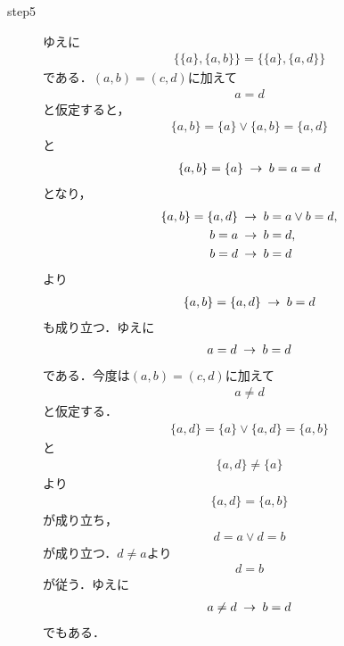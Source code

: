 \begin{sketch}
\begin{description}
			\item[step5]
		ゆえに
		\begin{align}
			\{\{a\},\{a,b\}\} = \{\{a\},\{a,d\}\}
		\end{align}
		である．$(a,b) = (c,d)$に加えて
		\begin{align}
			a = d
		\end{align}
		と仮定すると，
		\begin{align}
			\{a,b\} = \{a\} \vee \{a,b\} = \{a,d\}
		\end{align}
		と
		\begin{align}
			\{a,b\} = \{a\} \hspace{0.25em}\rightarrow\hspace{0.25em} b = a = d
		\end{align}
		となり，
		\begin{align}
			\{a,b\} = \{a,d\} &\hspace{0.25em}\rightarrow\hspace{0.25em} b = a \vee b = d, \\
			b = a &\hspace{0.25em}\rightarrow\hspace{0.25em} b = d, \\
			b = d &\hspace{0.25em}\rightarrow\hspace{0.25em} b = d
		\end{align}
		より
		\begin{align}
			\{a,b\} = \{a,d\} \hspace{0.25em}\rightarrow\hspace{0.25em} b = d
		\end{align}
		も成り立つ．ゆえに
		\begin{align}
			a = d \hspace{0.25em}\rightarrow\hspace{0.25em} b = d
		\end{align}
		である．今度は$(a,b) = (c,d)$に加えて
		\begin{align}
			a \neq d
		\end{align}
		と仮定する．
		\begin{align}
			\{a,d\} = \{a\} \vee \{a,d\} = \{a,b\}
		\end{align}
		と
		\begin{align}
			\{a,d\} \neq \{a\}
		\end{align}
		より
		\begin{align}
			\{a,d\} = \{a,b\}
		\end{align}
		が成り立ち，
		\begin{align}
			d = a \vee d = b
		\end{align}
		が成り立つ．$d \neq a$より
		\begin{align}
			d = b
		\end{align}
		が従う．ゆえに
		\begin{align}
			a \neq d \hspace{0.25em}\rightarrow\hspace{0.25em} b = d
		\end{align}
		でもある．
		\QED
		\end{description}
	\end{sketch}